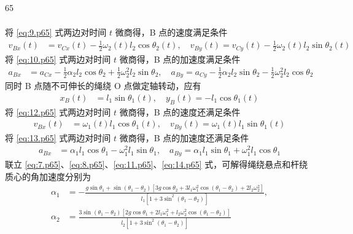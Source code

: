\begin{solution}{65}
\begin{subsolution}
\begin{align}
        \end{align}
        将 \eqref{eq:9.p65} 式两边对时间 $t$ 微商得，B 点的速度满足条件
        \begin{align}
            v_{Bx}(t) &= v_{Cx}(t) - \frac{1}{2} \omega_{2}(t) l_{2} \cos \theta_{2}(t), \quad v_{By}(t) = v_{Cy}(t) - \frac{1}{2} \omega_{2}(t) l_{2} \sin \theta_{2}(t) \label{eq:10.p65}
        \end{align}
        将 \eqref{eq:10.p65} 式两边对时间 $t$ 微商得，B 点的加速度满足条件
        \begin{align}
            a_{Bx} &= a_{Cx} - \frac{1}{2} \alpha_{2} l_{2} \cos \theta_{2} + \frac{1}{2} \omega_{2}^{2} l_{2} \sin \theta_{2}, \quad a_{By} = a_{Cy} - \frac{1}{2} \alpha_{2} l_{2} \sin \theta_{2} - \frac{1}{2} \omega_{2}^{2} l_{2} \cos \theta_{2} \label{eq:11.p65}
        \end{align}
        同时 B 点随不可伸长的绳绕 O 点做定轴转动，应有
        \begin{align}
            x_{B}(t) &= l_{1} \sin \theta_{1}(t), \quad y_{B}(t) = -l_{1} \cos \theta_{1}(t) \label{eq:12.p65}
        \end{align}
        将 \eqref{eq:12.p65} 式两边对时间 $t$ 微商得，B 点的速度还满足条件
        \begin{align}
            v_{Bx}(t) &= \omega_{1}(t) l_{1} \cos \theta_{1}(t), \quad v_{By}(t) = \omega_{1}(t) l_{1} \sin \theta_{1}(t) \label{eq:13.p65}
        \end{align}
        将 \eqref{eq:13.p65} 式两边对时间 $t$ 微商得，B 点的加速度还满足条件
        \begin{align}
            a_{Bx} &= \alpha_{1} l_{1} \cos \theta_{1} - \omega_{1}^{2} l_{1} \sin \theta_{1}, \quad a_{By} = \alpha_{1} l_{1} \sin \theta_{1} + \omega_{1}^{2} l_{1} \cos \theta_{1} \label{eq:14.p65}
        \end{align}
        联立 \eqref{eq:7.p65}、\eqref{eq:8.p65}、\eqref{eq:11.p65}、\eqref{eq:14.p65} 式，可解得绳绕悬点和杆绕质心的角加速度分别为
        \begin{align}
            \alpha_{1} &= -\frac{g \sin \theta_{1} + \sin(\theta_{1} - \theta_{2}) \left[ 3g \cos \theta_{2} + 3l_{1} \omega_{1}^{2} \cos(\theta_{1} - \theta_{2}) + 2l_{2} \omega_{2}^{2} \right]}{l_{1} \left[ 1 + 3 \sin^{2}(\theta_{1} - \theta_{2}) \right]}, \nonumber \\
            \alpha_{2} &= \frac{3 \sin(\theta_{1} - \theta_{2}) \left[ 2g \cos \theta_{1} + 2l_{1} \omega_{1}^{2} + l_{2} \omega_{2}^{2} \cos(\theta_{1} - \theta_{2}) \right]}{l_{2} \left[ 1 + 3 \sin^{2}(\theta_{1} - \theta_{2}) \right]} \label{eq:15.p65}
        \end{align}
    \end{subsolution}
\end{solution}